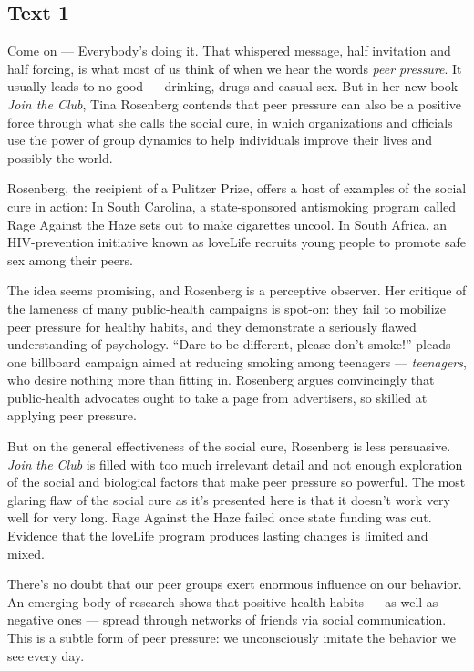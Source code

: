 \documentclass[UTF8,11pt]{ctexart}
\begin{document}
\subsection*{\textbf{Text 1}}


Come on — Everybody’s doing it. That whispered message, half invitation and half forcing, is what most of us think of when we hear the words \textit{peer pressure}. It usually leads to no good — drinking, drugs and casual sex. But in her new book \textit{Join the Club}, Tina Rosenberg contends that peer pressure can also be a positive force through what she calls the social cure, in which organizations and officials use the power of group dynamics to help individuals improve their lives and possibly the world.


Rosenberg, the recipient of a Pulitzer Prize, offers a host of examples of the social cure in action: In South Carolina, a state-sponsored antismoking program called Rage Against the Haze sets out to make cigarettes uncool. In South Africa, an HIV-prevention initiative known as loveLife recruits young people to promote safe sex among their peers.


The idea seems promising, and Rosenberg is a perceptive observer. Her critique of the lameness of many public-health campaigns is spot-on: they fail to mobilize peer pressure for healthy habits, and they demonstrate a seriously flawed understanding of psychology. “Dare to be different, please don’t smoke!” pleads one billboard campaign aimed at reducing smoking among teenagers — \textit{teenagers}, who desire nothing more than fitting in. Rosenberg argues convincingly that public-health advocates ought to take a page from advertisers, so skilled at applying peer pressure.


But on the general effectiveness of the social cure, Rosenberg is less persuasive. \textit{Join} \textit{the Club} is filled with too much irrelevant detail and not enough exploration of the social and biological factors that make peer pressure so powerful. The most glaring flaw of the social cure as it’s presented here is that it doesn’t work very well for very long. Rage Against the Haze failed once state funding was cut. Evidence that the loveLife program produces lasting changes is limited and mixed.


There’s no doubt that our peer groups exert enormous influence on our behavior. An emerging body of research shows that positive health habits — as well as negative ones — spread through networks of friends via social communication. This is a subtle form of peer pressure: we unconsciously imitate the behavior we see every day.
\end{document}
